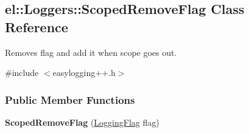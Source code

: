 \hypertarget{a00079}{}\subsection{el\+:\+:Loggers\+:\+:Scoped\+Remove\+Flag Class Reference}
\label{a00079}


Removes flag and add it when scope goes out.  




{\ttfamily \#include $<$easylogging++.\+h$>$}

\subsubsection*{Public Member Functions}
\begin{DoxyCompactItemize}
\item 
\hypertarget{a00079_a7ae9a1cde34e1145d8b90b639cc12dc1}{}{\bfseries Scoped\+Remove\+Flag} (\hyperlink{a00183_a2784aacd04cb7816ac1c0b20fcbf83cb}{Logging\+Flag} flag)\label{a00079_a7ae9a1cde34e1145d8b90b639cc12dc1}

\end{DoxyCompactItemize}
